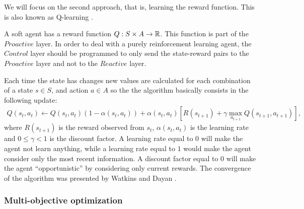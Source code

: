 We will focus on the second approach, that is, learning the reward function. This is also known as Q-learning \cite{Watkins89Learning}.

A soft agent has a reward function $Q:S \times A \rightarrow \mathbb R$. This function is part of the $Proactive$ layer.  In order to deal with a purely reinforcement learning agent, the $Control$ layer should be programmed to only send the state-reward pairs to the $Proactive$ layer and not to the $Reactive$ layer.

Each time the state has changes new values are calculated for each combination of a state $s \in S$, and action $a \in A$ so the the algorithm basically consists in the following update:
\begin{align}
Q(s_{t},a_{t}) \leftarrow Q(s_{t},a_{t}) (1-\alpha(s_{t},a_{t})) + \alpha(s_{t},a_{t}) [ R(s_{t+1}) + \gamma \max_{a_{t+1}} Q(s_{t+1},a_{t+1})  ],
\end{align}
where $R(s_{t+1})$ is the reward observed from $s_{t}$, $\alpha(s_{t},a_{t})$ is the learning rate and $0 \leq \gamma < 1$ is the discount factor.
A learning rate equal to $0$ will make the agent not learn anything, while a learning rate equal to $1$ would make the agent consider only the most recent information. A discount factor equal to $0$ will make the agent ``opportunistic'' by considering only current rewards. The convergence of the algorithm was presented by Watkins and Dayan \cite{Watkins92Technical}.

\subsubsection{Multi-objective optimization}
\label{sec:moop}

